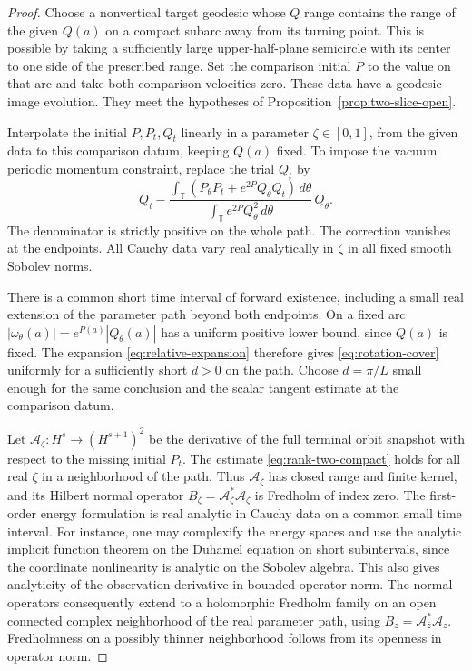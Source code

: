 \begin{proof}
Choose a nonvertical target geodesic whose $Q$ range
contains the range of the given $Q(a)$ on a compact
subarc away from its turning point. This is possible by
taking a sufficiently large upper-half-plane semicircle
with its center to one side of the prescribed range.
Set the comparison initial $P$ to the value on that
arc and take both comparison velocities zero.
These data have a geodesic-image evolution.
They meet the hypotheses of Proposition~\ref{prop:two-slice-open}.

Interpolate the initial $P,P_t,Q_t$ linearly in a
parameter $\zeta\in[0,1]$, from the given data to this
comparison datum, keeping $Q(a)$ fixed.
To impose the vacuum periodic momentum constraint,
replace the trial $Q_t$ by
\[
 Q_t-\frac{\int_{\mathbb T}
        (P_\theta P_t+e^{2P}Q_\theta Q_t)\,d\theta}
       {\int_{\mathbb T}e^{2P}Q_\theta^2\,d\theta}\,Q_\theta .
\]
The denominator is strictly positive on the whole
path. The correction vanishes at the endpoints.
All Cauchy data vary real analytically in $\zeta$ in
all fixed smooth Sobolev norms.

There is a common short time interval of forward
existence, including a small real extension of the
parameter path beyond both endpoints. On a fixed
arc $|\omega_\theta(a)|=e^{P(a)}|Q_\theta(a)|$
has a uniform positive lower bound, since $Q(a)$
is fixed. The expansion \eqref{eq:relative-expansion}
therefore gives \eqref{eq:rotation-cover} uniformly
for a sufficiently short $d>0$ on the path.
Choose $d=\pi/L$ small enough for the same conclusion
and the scalar tangent estimate at the comparison datum.

Let $\mathcal A_\zeta:H^s\to (H^{s+1})^2$
be the derivative of the full terminal orbit snapshot
with respect to the missing initial $P_t$.
The estimate \eqref{eq:rank-two-compact} holds for
all real $\zeta$ in a neighborhood of the path.
Thus $\mathcal A_\zeta$ has closed range and finite
kernel, and its Hilbert normal operator
$B_\zeta=\mathcal A_\zeta^\ast\mathcal A_\zeta$
is Fredholm of index zero.
The first-order energy formulation is real analytic
in Cauchy data on a common small time interval.
For instance, one may complexify the energy spaces and
use the analytic implicit function theorem on the
Duhamel equation on short subintervals, since the
coordinate nonlinearity is analytic on the Sobolev
algebra. This also gives analyticity of the observation
derivative in bounded-operator norm.
The normal operators consequently extend to a holomorphic
Fredholm family on an open connected complex
neighborhood of the real parameter path, using
$B_z=\mathcal A_{\bar z}^\ast\mathcal A_z$.
Fredholmness on a possibly thinner neighborhood follows
from its openness in operator norm.


\end{proof}
